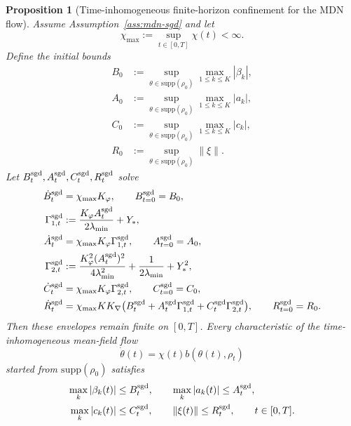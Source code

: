 \documentclass[11pt]{article}
\newtheorem{proposition}[theorem]{Proposition}
\theoremstyle{definition}
\newcommand{\supp}{\mathrm{supp}}
\newcommand{\norm}[1]{\left\lVert #1 \right\rVert}
\begin{document}
\begin{proposition}[Time-inhomogeneous finite-horizon confinement for the MDN flow]
\label{prop:mdn-confinement}
Assume Assumption~\ref{ass:mdn-sgd} and let
\[
  \chi_{\max}:=\sup_{t\in[0,T]}\chi(t)<\infty.
\]
Define the initial bounds
\begin{align*}
  B_0
  &:=
  \sup_{\theta\in\supp(\rho_0)}\max_{1\le k\le K}|\beta_k|,
  \\
  A_0
  &:=
  \sup_{\theta\in\supp(\rho_0)}\max_{1\le k\le K}|a_k|,
  \\
  C_0
  &:=
  \sup_{\theta\in\supp(\rho_0)}\max_{1\le k\le K}|c_k|,
  \\
  R_0
  &:=
  \sup_{\theta\in\supp(\rho_0)}\norm{\xi}.
\end{align*}
Let $B_t^{\rm sgd},A_t^{\rm sgd},C_t^{\rm sgd},R_t^{\rm sgd}$ solve
\begin{align}
  \dot B_t^{\rm sgd}
  &=
  \chi_{\max}K_\varphi,
  \qquad
  B_{t=0}^{\rm sgd}=B_0,
  \label{eq:B-envelope-mdn-sgd}
  \\
  \Gamma_{1,t}^{\rm sgd}
  &:=
  \frac{K_\varphi A_t^{\rm sgd}}{2\lambda_{\min}}+Y_\ast,
  \label{eq:Gamma1-mdn-sgd}
  \\
  \dot A_t^{\rm sgd}
  &=
  \chi_{\max}K_\varphi \Gamma_{1,t}^{\rm sgd},
  \qquad
  A_{t=0}^{\rm sgd}=A_0,
  \label{eq:A-envelope-mdn-sgd}
  \\
  \Gamma_{2,t}^{\rm sgd}
  &:=
  \frac{K_\varphi^2 (A_t^{\rm sgd})^2}{4\lambda_{\min}^2}
  +
  \frac{1}{2\lambda_{\min}}
  +
  Y_\ast^2,
  \label{eq:Gamma2-mdn-sgd}
  \\
  \dot C_t^{\rm sgd}
  &=
  \chi_{\max}K_\varphi \Gamma_{2,t}^{\rm sgd},
  \qquad
  C_{t=0}^{\rm sgd}=C_0,
  \label{eq:C-envelope-mdn-sgd}
  \\
  \dot R_t^{\rm sgd}
  &=
  \chi_{\max}K K_\nabla
  \big(
    B_t^{\rm sgd}
    +
    A_t^{\rm sgd}\Gamma_{1,t}^{\rm sgd}
    +
    C_t^{\rm sgd}\Gamma_{2,t}^{\rm sgd}
  \big),
  \qquad
  R_{t=0}^{\rm sgd}=R_0.
  \label{eq:R-envelope-mdn-sgd}
\end{align}
Then these envelopes remain finite on $[0,T]$. Every characteristic of the
time-inhomogeneous mean-field flow
\[
  \dot\theta(t)=\chi(t)b(\theta(t),\rho_t)
\]
started from $\supp(\rho_0)$ satisfies
\[
  \begin{aligned}
    \max_k|\beta_k(t)|&\le B_t^{\rm sgd},
    \qquad
    \max_k|a_k(t)|\le A_t^{\rm sgd},
    \\
    \max_k|c_k(t)|&\le C_t^{\rm sgd},
    \qquad
    \norm{\xi(t)}\le R_t^{\rm sgd},
    \qquad t\in[0,T].

\end{aligned}\]
\end{proposition}
\end{document}
